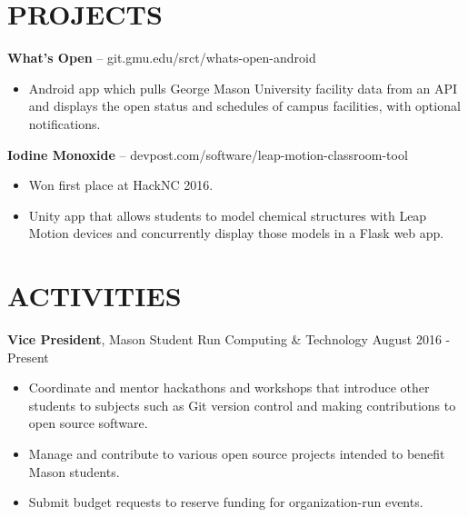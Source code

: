 \documentclass[11pt]{res} %
\begin{document}
\begin{resume}
\vspace{-15pt}
\noindent\makebox[\linewidth]{\rule{\textwidth}{1pt}}


\vspace{-10pt}\section{PROJECTS} \smallskip

\textbf{What's Open} -- git.gmu.edu/srct/whats-open-android \smallskip
\begin{itemize}
\item Android app which pulls George Mason University facility data from an API and displays the open status and schedules of campus facilities, with optional notifications.
\end{itemize}

\vspace{-8pt}\textbf{Iodine Monoxide} -- devpost.com/software/leap-motion-classroom-tool \smallskip
\begin{itemize}
\item Won first place at HackNC 2016.
\item Unity app that allows students to model chemical structures with Leap Motion devices and concurrently display those models in a Flask web app.
\end{itemize}

\vspace{-15pt}
\noindent\makebox[\linewidth]{\rule{\textwidth}{1pt}}


\vspace{-10pt}\section{ACTIVITIES} \smallskip

\textbf{Vice President}, Mason Student Run Computing \& Technology \hfill August 2016 - Present\smallskip
\begin{itemize}
\item Coordinate and mentor hackathons and workshops that introduce other students to subjects such as Git version control and making contributions to open source software.
\item Manage and contribute to various open source projects intended to benefit Mason students.
\item Submit budget requests to reserve funding for organization-run events.
\end{itemize}


\end{resume}
\end{document}
